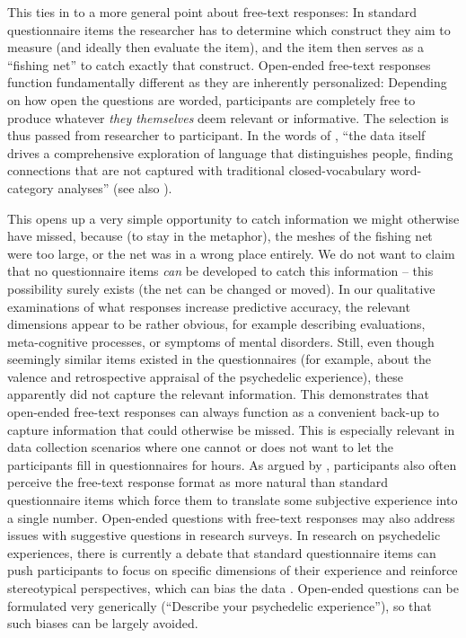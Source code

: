\documentclass[man,floatsintext]{apa7}
\newcommand{\change}[1]{#1}
\begin{document}
This ties in to a more general point about free-text responses: In standard questionnaire items  the researcher has to determine which construct they aim to measure (and ideally then evaluate the item), and the item then serves as a ``fishing net'' to catch exactly that construct.  Open-ended free-text responses function fundamentally different \change{as they are inherently personalized}: Depending on how open the questions are worded, participants are completely free to produce whatever \emph{they themselves} deem relevant or informative. The selection is thus passed from researcher to participant. In the words of \textcite{schwartz2013personality}, ``the data itself drives a comprehensive exploration of language that distinguishes people, finding connections that are not captured with traditional closed-vocabulary word-category analyses'' (see also \cite{boyd2021natural}).

This opens up a very simple opportunity to catch information we might otherwise have missed, because (to stay in the metaphor), the meshes of the fishing net were too large, or the net was in a wrong place entirely. We do not want to claim that no questionnaire items \emph{can} be developed to catch this information -- this possibility surely exists (the net can be changed or moved). In our qualitative examinations of what responses increase predictive accuracy, the relevant dimensions appear to be rather obvious, for example describing evaluations, meta-cognitive processes, or symptoms of mental disorders. Still, even though seemingly similar items existed in the questionnaires (for example, about the valence and retrospective appraisal of the psychedelic experience), these apparently did not capture the relevant information. This demonstrates that open-ended free-text responses can always function as a convenient back-up to capture information that could otherwise be missed. This is especially relevant in data collection scenarios where one cannot or does not want to let the participants fill in questionnaires for hours. As argued by \parencite{kjell2022natural,Kjell2019}, participants also often perceive the free-text response format as more natural than standard questionnaire items which force them to translate some subjective experience into a single number. \change{Open-ended questions with free-text responses may also address issues with suggestive questions in research surveys. In research on psychedelic experiences, there is currently a debate that standard questionnaire items can push participants to focus on specific dimensions of their experience and reinforce stereotypical perspectives, which can bias the data \parencite{vanderijst2026redefining}. Open-ended questions can be formulated very generically (``Describe your psychedelic experience''), so that such biases can be largely avoided.}
\end{document}
